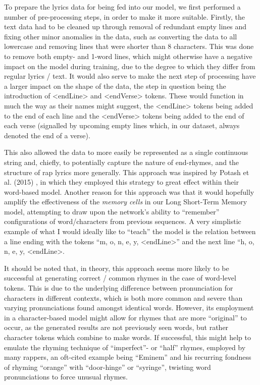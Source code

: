 To prepare the lyrics data for being fed into our model, we first performed a number of pre-processing steps, in order to make it more suitable. Firstly, the text data had to be cleaned up through removal of redundant empty lines and fixing other minor anomalies in the data, such as converting the data to all lowercase and removing lines that were shorter than 8 characters. This was done to remove both empty- and 1-word lines, which might otherwise have a negative impact on the model during training, due to the degree to which they differ from regular lyrics / text. It would also serve to make the next step of processing have a larger impact on the shape of the data, the step in question being the introduction of \textless{}endLine\textgreater{} and \textless{}endVerse\textgreater{} tokens. These would function in much the way as their names might suggest, the \textless{}endLine\textgreater{} tokens being added to the end of each line and the \textless{}endVerse\textgreater{} tokens being added to the end of each verse (signalled by upcoming empty lines which, in our dataset, always denoted the end of a verse).

This also allowed the data to more easily be represented as a single continuous string and, chiefly, to potentially capture the nature of end-rhymes, and the structure of rap lyrics more generally. This approach was inspired by Potash et al. (2015) \cite{potash-etal-2015-ghostwriter}, in which they employed this strategy to great effect within their word-based model. Another reason for this approach was that it would hopefully amplify the effectiveness of the \textit{memory cells} in our Long Short-Term Memory model, attempting to draw upon the network's ability to “remember” configurations of word/characters from previous sequences. A very simplistic example of what I would ideally like to “teach” the model is the relation between a line ending with the tokens “m, o, n, e, y, \textless{}endLine\textgreater{}” and the next line “h, o, n, e, y, \textless{}endLine\textgreater{}.

It should be noted that, in theory, this approach seems more likely to be successful at generating correct / common rhymes in the case of word-level tokens. This is due to the underlying difference between pronunciation for characters in different contexts, which is both more common and severe than varying pronunciations found amongst identical words. However, its employment in a character-based model might allow for rhymes that are more “original” to occur, as the generated results are not previously seen words, but rather character tokens which combine to make words. If successful, this might help to emulate the rhyming technique of “imperfect”- or “half” rhymes, employed by many rappers, an oft-cited example being “Eminem” and his recurring fondness of rhyming “orange” with “door-hinge” or “syringe”, twisting word pronunciations to force unusual rhymes.

